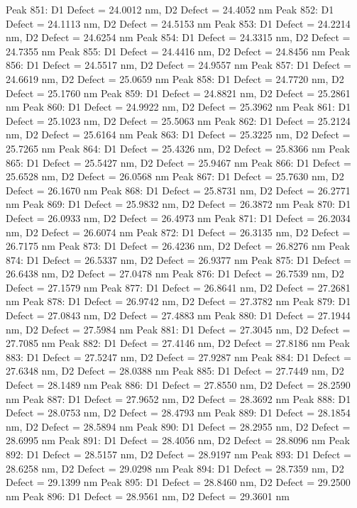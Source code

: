 \documentclass{article}
\begin{document}
Peak 851: D1 Defect = 24.0012 nm, D2 Defect = 24.4052 nm
Peak 852: D1 Defect = 24.1113 nm, D2 Defect = 24.5153 nm
Peak 853: D1 Defect = 24.2214 nm, D2 Defect = 24.6254 nm
Peak 854: D1 Defect = 24.3315 nm, D2 Defect = 24.7355 nm
Peak 855: D1 Defect = 24.4416 nm, D2 Defect = 24.8456 nm
Peak 856: D1 Defect = 24.5517 nm, D2 Defect = 24.9557 nm
Peak 857: D1 Defect = 24.6619 nm, D2 Defect = 25.0659 nm
Peak 858: D1 Defect = 24.7720 nm, D2 Defect = 25.1760 nm
Peak 859: D1 Defect = 24.8821 nm, D2 Defect = 25.2861 nm
Peak 860: D1 Defect = 24.9922 nm, D2 Defect = 25.3962 nm
Peak 861: D1 Defect = 25.1023 nm, D2 Defect = 25.5063 nm
Peak 862: D1 Defect = 25.2124 nm, D2 Defect = 25.6164 nm
Peak 863: D1 Defect = 25.3225 nm, D2 Defect = 25.7265 nm
Peak 864: D1 Defect = 25.4326 nm, D2 Defect = 25.8366 nm
Peak 865: D1 Defect = 25.5427 nm, D2 Defect = 25.9467 nm
Peak 866: D1 Defect = 25.6528 nm, D2 Defect = 26.0568 nm
Peak 867: D1 Defect = 25.7630 nm, D2 Defect = 26.1670 nm
Peak 868: D1 Defect = 25.8731 nm, D2 Defect = 26.2771 nm
Peak 869: D1 Defect = 25.9832 nm, D2 Defect = 26.3872 nm
Peak 870: D1 Defect = 26.0933 nm, D2 Defect = 26.4973 nm
Peak 871: D1 Defect = 26.2034 nm, D2 Defect = 26.6074 nm
Peak 872: D1 Defect = 26.3135 nm, D2 Defect = 26.7175 nm
Peak 873: D1 Defect = 26.4236 nm, D2 Defect = 26.8276 nm
Peak 874: D1 Defect = 26.5337 nm, D2 Defect = 26.9377 nm
Peak 875: D1 Defect = 26.6438 nm, D2 Defect = 27.0478 nm
Peak 876: D1 Defect = 26.7539 nm, D2 Defect = 27.1579 nm
Peak 877: D1 Defect = 26.8641 nm, D2 Defect = 27.2681 nm
Peak 878: D1 Defect = 26.9742 nm, D2 Defect = 27.3782 nm
Peak 879: D1 Defect = 27.0843 nm, D2 Defect = 27.4883 nm
Peak 880: D1 Defect = 27.1944 nm, D2 Defect = 27.5984 nm
Peak 881: D1 Defect = 27.3045 nm, D2 Defect = 27.7085 nm
Peak 882: D1 Defect = 27.4146 nm, D2 Defect = 27.8186 nm
Peak 883: D1 Defect = 27.5247 nm, D2 Defect = 27.9287 nm
Peak 884: D1 Defect = 27.6348 nm, D2 Defect = 28.0388 nm
Peak 885: D1 Defect = 27.7449 nm, D2 Defect = 28.1489 nm
Peak 886: D1 Defect = 27.8550 nm, D2 Defect = 28.2590 nm
Peak 887: D1 Defect = 27.9652 nm, D2 Defect = 28.3692 nm
Peak 888: D1 Defect = 28.0753 nm, D2 Defect = 28.4793 nm
Peak 889: D1 Defect = 28.1854 nm, D2 Defect = 28.5894 nm
Peak 890: D1 Defect = 28.2955 nm, D2 Defect = 28.6995 nm
Peak 891: D1 Defect = 28.4056 nm, D2 Defect = 28.8096 nm
Peak 892: D1 Defect = 28.5157 nm, D2 Defect = 28.9197 nm
Peak 893: D1 Defect = 28.6258 nm, D2 Defect = 29.0298 nm
Peak 894: D1 Defect = 28.7359 nm, D2 Defect = 29.1399 nm
Peak 895: D1 Defect = 28.8460 nm, D2 Defect = 29.2500 nm
Peak 896: D1 Defect = 28.9561 nm, D2 Defect = 29.3601 nm
\end{document}
